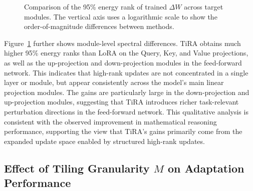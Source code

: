 \documentclass[a4paper,11pt]{article}
\newcommand{\DeltaW}{\Delta W}
\begin{document}
\begin{figure}[H]
    \centering
    \caption{Comparison of the 95\% energy rank of trained $\DeltaW$ across target modules. The vertical axis uses a logarithmic scale to show the order-of-magnitude differences between methods.}
    \label{fig:delta_spectrum_rank95}
\end{figure}

Figure~\ref{fig:delta_spectrum_rank95} further shows module-level spectral differences. TiRA obtains much higher 95\% energy ranks than LoRA on the Query, Key, and Value projections, as well as the up-projection and down-projection modules in the feed-forward network. This indicates that high-rank updates are not concentrated in a single layer or module, but appear consistently across the model's main linear projection modules. The gains are particularly large in the down-projection and up-projection modules, suggesting that TiRA introduces richer task-relevant perturbation directions in the feed-forward network. This qualitative analysis is consistent with the observed improvement in mathematical reasoning performance, supporting the view that TiRA's gains primarily come from the expanded update space enabled by structured high-rank updates.

\subsection{\texorpdfstring{Effect of Tiling Granularity $M$ on Adaptation Performance}{Effect of Tiling Granularity M on Adaptation Performance}}
\end{document}
